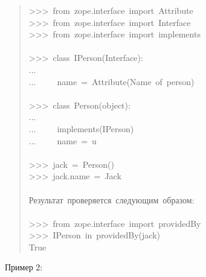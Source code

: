 \documentclass[a4paper,openany,twoside,final]{book}
\begin{document}
\begin{quote}{\ttfamily \raggedright \noindent
>{}>{}>~from~zope.interface~import~Attribute\\
>{}>{}>~from~zope.interface~import~Interface\\
>{}>{}>~from~zope.interface~import~implements\\
~\\
>{}>{}>~class~IPerson(Interface):\\
...\\
...~~~~~name~=~Attribute(\textquotedbl{}Name~of~person\textquotedbl{})\\
~\\
>{}>{}>~class~Person(object):\\
...\\
...~~~~~implements(IPerson)\\
...~~~~~name~=~u\textquotedbl{}\textquotedbl{}\\
~\\
>{}>{}>~jack~=~Person()\\
>{}>{}>~jack.name~=~\textquotedbl{}Jack\textquotedbl{}\\
~\\
Результат~проверяется~следующим~образом:\\
~\\
>{}>{}>~from~zope.interface~import~providedBy\\
>{}>{}>~IPerson~in~providedBy(jack)\\
True
}
\end{quote}

Пример 2:
\end{document}
